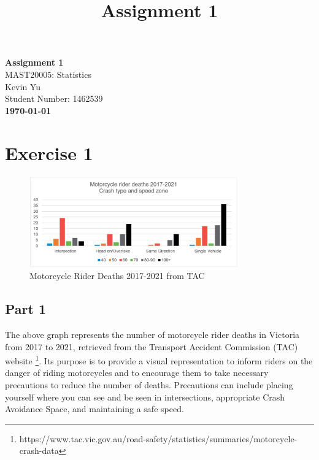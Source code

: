 \documentclass{article}
\title{Assignment 1}
\author{}
\date{}
\begin{document}
\begin{titlepage}
    \centering
    \vspace*{2in}
    {\Huge \textbf{Assignment 1}}\\[1.5cm]
    {\Large MAST20005: Statistics}\\[0.5cm]
    {\Large Kevin Yu}\\[0.5cm]
    {\Large Student Number: 1462539}\\[2in]
    \vfill
    \large \textbf{\today}
    \vfill
\end{titlepage}

\newpage
\section*{Exercise 1}
\begin{figure}[h!]
    \centering
    \includegraphics[width=0.8\textwidth]{images/motorcycle-rider-deaths.jpg}
    \caption{Motorcycle Rider Deaths 2017-2021 from TAC}
    \label{fig:motorcycle-deaths}
\end{figure}

\subsection*{Part 1}
The above graph represents the number of motorcycle rider deaths in Victoria from 2017 to 2021, retrieved from the Transport Accident Commission (TAC) website \footnote[1]{https://www.tac.vic.gov.au/road-safety/statistics/summaries/motorcycle-crash-data}. Its purpose is to provide a visual representation to inform riders on the danger of riding motorcycles and to encourage them to take necessary precautions to reduce the number of deaths. Precautions can include placing yourself where you can see and be seen in intersections, appropriate Crash Avoidance Space, and maintaining a safe speed. \\
\end{document}
